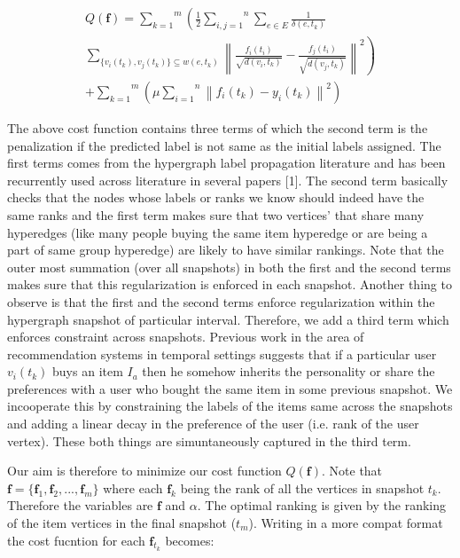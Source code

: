 \documentclass[conference]{IEEEtran}
\begin{document}
\begin{equation}
\begin{align}

Q(\mathbf{f}) = \overset{m}{\underset{k=1}{\sum}} \left ( \frac{1}{2} \overset{n}{\underset{i,j=1}{\sum}} \underset{e \in E}{\sum} \frac{1}{\delta(e,t_k)} \right. \\ \left. \underset{ \{v_i(t_k), v_j(t_k) \}{ \subseteq w(e,t_k)}}{\sum} \left \| \frac{f_i(t_i)}{\sqrt{d(v_i,t_k)}} - \frac{f_j(t_i)}{\sqrt{d(v_j,t_k)}} \right \|^{2} \right ) \\ + \overset{m}{\underset{k=1}{\sum}} \left( \mu \overset{n}{\underset{i=1}{\sum}} \left\|f_i(t_k) - y_i(t_k)\right\|^{2} \right ) 

\end{align}
\end{equation}

The above cost function contains three terms of which the second term is the penalization if the predicted label is not same as the initial labels assigned. The first terms comes from the hypergraph label propagation literature \cite{Zhou06} and has been recurrently used across literature in several papers [1]\cite{kuang08}. The second term basically checks that the nodes whose labels or ranks we know should indeed have the same ranks and the first term makes sure that two vertices’ that share many hyperedges (like many people buying the same item hyperedge or are being a part of same group hyperedge) are likely to have similar rankings. Note that the outer most summation (over all snapshots) in both the first and the second terms makes sure that this regularization is enforced in each snapshot. Another thing to observe is that the first and the second terms enforce regularization within the hypergraph snapshot of particular interval. Therefore, we add a third term which enforces constraint across snapshots. Previous work in the area of recommendation systems \cite{koren10} in temporal settings suggests that if a particular user $v_i(t_k)$ buys an item $I_a$ then he somehow inherits the personality or share the preferences with a user who bought the same item in some previous snapshot. We incooperate this by constraining the labels of the items same across the snapshots and adding a linear decay in the preference of the user (i.e. rank of the user vertex). These both things are simuntaneously captured in the third term. 

Our aim is therefore to minimize our cost function $Q(\mathbf{f})$. Note that $\mathbf{f} = \{ \mathbf{f}_1,\mathbf{f}_2, ..., \mathbf{f}_m\}$ where each $\mathbf{f}_k$ being the rank of all the vertices in snapshot $t_k$. Therefore the variables are $\mathbf{f}$ and $\alpha$. The optimal ranking is given by the ranking of the item vertices in the final snapshot ($t_m$). Writing in a more compat format the cost fucntion for each $\mathbf{f}_{t_k}$ becomes:
\end{document}
